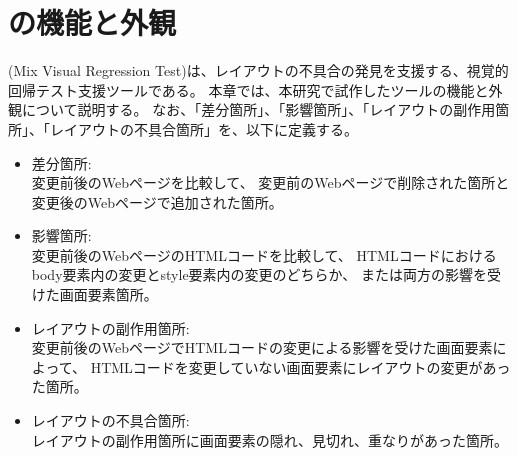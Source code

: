 \chapter{ \toolName の機能と外観}\label{cha:Function}
\toolName (Mix Visual Regression Test)は、レイアウトの不具合の発見を支援する、視覚的回帰テスト支援ツールである。
本章では、本研究で試作したツール\toolName の機能と外観について説明する。
なお、「差分箇所」、「影響箇所」、「レイアウトの副作用箇所」、「レイアウトの不具合箇所」を、以下に定義する。
\begin{itemize}
    \item 差分箇所:\\
          変更前後のWebページを比較して、
          変更前のWebページで削除された箇所と変更後のWebページで追加された箇所。
    \item 影響箇所:\\
          変更前後のWebページのHTMLコードを比較して、
          HTMLコードにおけるbody要素内の変更とstyle要素内の変更のどちらか、
          または両方の影響を受けた画面要素箇所。
    \item レイアウトの副作用箇所:\\
          変更前後のWebページでHTMLコードの変更による影響を受けた画面要素によって、
          HTMLコードを変更していない画面要素にレイアウトの変更があった箇所。
    \item レイアウトの不具合箇所:\\
          レイアウトの副作用箇所に画面要素の隠れ、見切れ、重なりがあった箇所。
\end{itemize}

